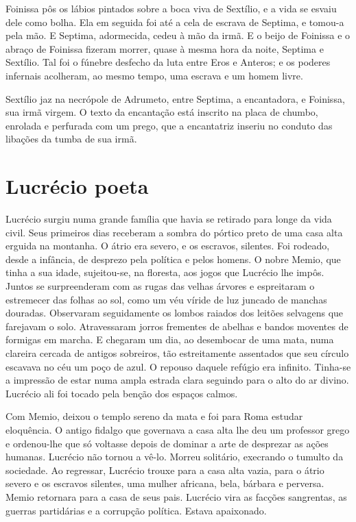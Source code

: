 Foinissa pôs os lábios pintados sobre a boca viva de Sextílio, e a vida se
esvaiu dele como bolha. Ela em seguida foi até a cela de escrava de
Septima, e tomou-a pela mão. E Septima, adormecida, cedeu à mão da irmã. E
o beijo de Foinissa e o abraço de Foinissa fizeram morrer, quase à mesma
hora da noite, Septima e Sextílio. Tal foi o fúnebre desfecho da luta
entre Eros e Anteros; e os poderes infernais acolheram, ao mesmo tempo,
uma escrava e um homem livre.

Sextílio jaz na necrópole de Adrumeto, entre Septima, a encantadora, e
Foinissa, sua irmã virgem. O texto da encantação está inscrito na placa de
chumbo, enrolada e perfurada com um prego, que a encantatriz inseriu no
conduto das libações da tumba de sua irmã.

\chapter{Lucrécio poeta}

Lucrécio surgiu numa grande família que havia se retirado para longe da
vida civil. Seus primeiros dias receberam a sombra do pórtico preto de uma
casa alta erguida na montanha. O átrio era severo, e os escravos,
silentes. Foi rodeado, desde a infância, de desprezo pela política e pelos
homens. O nobre Memio, que tinha a sua idade, sujeitou-se, na floresta,
aos jogos que Lucrécio lhe impôs. Juntos se surpreenderam com as rugas das
velhas árvores e espreitaram o estremecer das folhas ao sol, como um véu
víride de luz juncado de manchas douradas. Observaram seguidamente os
lombos raiados dos leitões selvagens que farejavam o solo. Atravessaram
jorros frementes de abelhas e bandos moventes de formigas em marcha. E
chegaram um dia, ao desembocar de uma mata, numa clareira cercada de
antigos sobreiros, tão estreitamente assentados que seu círculo escavava
no céu um poço de azul. O repouso daquele refúgio era infinito. Tinha-se a
impressão de estar numa ampla estrada clara seguindo para o alto do ar
divino. Lucrécio ali foi tocado pela benção dos espaços calmos.

Com Memio, deixou o templo sereno da mata e foi para Roma estudar
eloquência. O antigo fidalgo que governava a casa alta lhe deu um
professor grego e ordenou-lhe que só voltasse depois de dominar a arte de
desprezar as ações humanas. Lucrécio não tornou a vê-lo. Morreu solitário,
execrando o tumulto da sociedade. Ao regressar, Lucrécio trouxe para a
casa alta vazia, para o átrio severo e os escravos silentes, uma mulher
africana, bela, bárbara e perversa. Memio retornara para a casa de seus
pais. Lucrécio vira as facções sangrentas, as guerras partidárias e a
corrupção política. Estava apaixonado.

